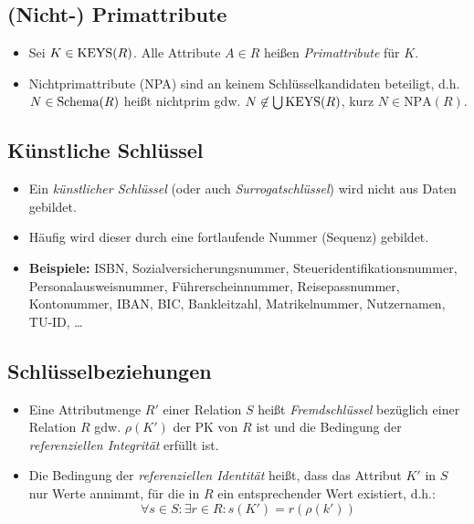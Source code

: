 		\subsection{(Nicht-) Primattribute} %
			\begin{itemize}
				\item Sei \( K \in \operatorname{KEYS}(R) \). Alle Attribute \( A \in R \) heißen \textit{Primattribute} für \(K\).
				\item Nichtprimattribute (NPA) sind an keinem Schlüsselkandidaten beteiligt, d.h. \( N \in \operatorname{Schema}(R) \) heißt nichtprim gdw. \( N \not\in \bigcup \operatorname{KEYS}(R) \), kurz \( N \in \text{NPA}(R) \).
			\end{itemize}

		\subsection{Künstliche Schlüssel} %
			\begin{itemize}
				\item Ein \textit{künstlicher Schlüssel} (oder auch \textit{Surrogatschlüssel}) wird nicht aus Daten gebildet.
				\item Häufig wird dieser durch eine fortlaufende Nummer (Sequenz) gebildet.
				\item \textbf{Beispiele:} ISBN, Sozialversicherungsnummer, Steueridentifikationsnummer, Personalausweisnummer, Führerscheinnummer, Reisepassnummer, Kontonummer, IBAN, BIC, Bankleitzahl, Matrikelnummer, Nutzernamen, TU-ID, \dots
			\end{itemize}

		\subsection{Schlüsselbeziehungen} %
			\begin{itemize}
				\item Eine Attributmenge \(R'\) einer Relation \(S\) heißt \textit{Fremdschlüssel} bezüglich einer Relation \(R\) gdw. \( \rho(K') \) der PK von \(R\) ist und die Bedingung der \textit{referenziellen Integrität} erfüllt ist.
				\item Die Bedingung der \textit{referenziellen Identität} heißt, dass das Attribut \(K'\) in \(S\) nur Werte annimmt, für die in \(R\) ein entsprechender Wert existiert, d.h.:
					\begin{equation*}
						\forall s \in S : \exists r \in R : s(K') = r(\rho(k'))
					\end{equation*}
			\end{itemize}

